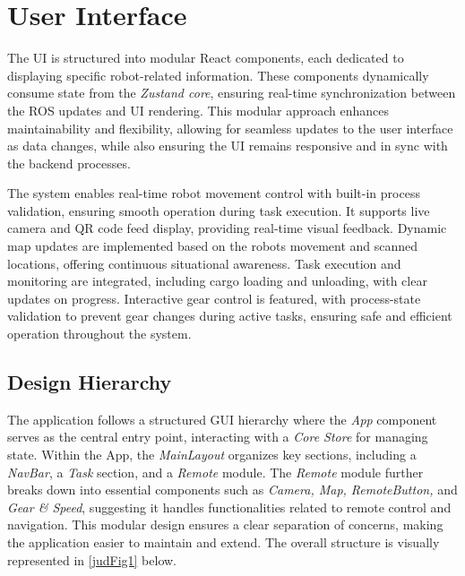 \documentclass[a4paper,12pt]{extreport}
\begin{document}
\section{User Interface}
The UI is structured into modular React components, each dedicated to
displaying specific robot-related information. These components
dynamically consume state from the \emph{Zustand core}, ensuring
real-time synchronization between the ROS updates and UI rendering. This
modular approach enhances maintainability and flexibility, allowing for
seamless updates to the user interface as data changes, while also
ensuring the UI remains responsive and in sync with the backend
processes.

The system enables real-time robot movement control with built-in
process validation, ensuring smooth operation during task execution. It
supports live camera and QR code feed display, providing real-time
visual feedback. Dynamic map updates are implemented based on the
robot\textquotesingle s movement and scanned locations, offering
continuous situational awareness. Task execution and monitoring are
integrated, including cargo loading and unloading, with clear updates on
progress. Interactive gear control is featured, with process-state
validation to prevent gear changes during active tasks, ensuring safe
and efficient operation throughout the system.

\subsection{Design Hierarchy}

The application follows a structured GUI hierarchy where the \emph{App}
component serves as the central entry point, interacting with a
\emph{Core Store} for managing state. Within the App, the
\emph{MainLayout} organizes key sections, including a \emph{NavBar}, a
\emph{Task} section, and a \emph{Remote} module. The \emph{Remote}
module further breaks down into essential components such as
\emph{Camera, Map, RemoteButton,} and \emph{Gear \& Speed}, suggesting
it handles functionalities related to remote control and navigation.
This modular design ensures a clear separation of concerns, making the
application easier to maintain and extend. The overall structure is
visually represented in \cref{judFig1} below.
\end{document}
